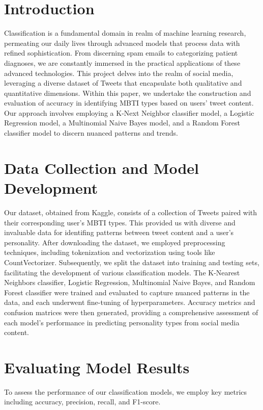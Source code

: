 \documentclass[twoside,11pt]{article}
\begin{document}
\section{Introduction}
Classification is a fundamental domain in realm of machine learning research, permeating our daily lives through advanced models that process data with refined sophistication. From discerning spam emails to categorizing patient diagnoses, we are constantly immersed in the practical applications of these advanced technologies. This project delves into the realm of social media, leveraging a diverse dataset of Tweets that encapsulate both qualitative and quantitative dimensions. Within this paper, we undertake the construction and evaluation of accuracy in identifying MBTI types based on users' tweet content. Our approach involves employing a K-Next Neighbor classifier model, a Logistic Regression model, a Multinomial Naive Bayes model, and a Random Forest classifier model to discern nuanced patterns and trends.\\

\section{Data Collection and Model Development}
Our dataset, obtained from Kaggle, consists of a collection of Tweets paired with their corresponding user's MBTI types. This provided us with diverse and invaluable data for identifing patterns between tweet content and a user's personality. After downloading the dataset, we employed preprocessing techniques, including tokenization and vectorization using tools like CountVectorizer. Subsequently, we split the dataset into training and testing sets, facilitating the development of various classification models. The K-Nearest Neighbors classifier, Logistic Regression, Multinomial Naive Bayes, and Random Forest classifier were trained and evaluated to capture nuanced patterns in the data, and each underwent fine-tuning of hyperparameters. Accuracy metrics and confusion matrices were then generated, providing a comprehensive assessment of each model's performance in predicting personality types from social media content.


\section{Evaluating Model Results}
To assess the performance of our classification models, we employ key metrics including accuracy, precision, recall, and F1-score.
\end{document}
